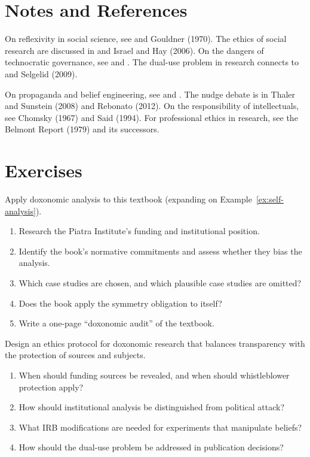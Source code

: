 \section{Notes and References}
\label{sec:ch34-notes}

On reflexivity in social science, see \textcite{bourdieu1984} and Gouldner (1970).
The ethics of social research are discussed in \textcite{salganik2018} and Israel and Hay (2006).
On the dangers of technocratic governance, see \textcite{scott1998} and \textcite{habermas1962}.
The dual-use problem in research connects to \textcite{oreskes2010} and Selgelid (2009).

On propaganda and belief engineering, see \textcite{bernays1928} and \textcite{ellul1965}.
The nudge debate is in Thaler and Sunstein (2008) and Rebonato (2012).
On the responsibility of intellectuals, see Chomsky (1967) and Said (1994).
For professional ethics in research, see the Belmont Report (1979) and its successors.

\section{Exercises}

\begin{exercise}
Apply doxonomic analysis to this textbook (expanding on Example~\ref{ex:self-analysis}).
\begin{enumerate}[nosep]
  \item Research the Piatra Institute's funding and institutional position.
  \item Identify the book's normative commitments and assess whether they bias the analysis.
  \item Which case studies are chosen, and which plausible case studies are omitted?
  \item Does the book apply the symmetry obligation to itself?
  \item Write a one-page ``doxonomic audit'' of the textbook.
\end{enumerate}
\end{exercise}

\begin{exercise}
Design an ethics protocol for doxonomic research that balances transparency with the protection of sources and subjects.
\begin{enumerate}[nosep]
  \item When should funding sources be revealed, and when should whistleblower protection apply?
  \item How should institutional analysis be distinguished from political attack?
  \item What IRB modifications are needed for experiments that manipulate beliefs?
  \item How should the dual-use problem be addressed in publication decisions?
\end{enumerate}
\end{exercise}

